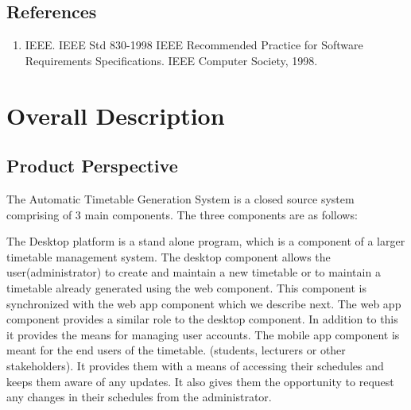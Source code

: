 \documentclass{scrreprt}
\begin{document}
   
 

\section{References}
\begin{enumerate}
 \item IEEE. IEEE Std 830-1998 IEEE Recommended Practice for Software Requirements Specifications. IEEE Computer Society, 1998.
\end{enumerate}

\chapter{Overall Description}

\section{Product Perspective}
  The Automatic Timetable Generation System is a closed source system comprising of 3  main components. The three components are as follows:
  
The Desktop platform is a stand alone program, which is a component of a larger timetable management system. The desktop component allows the user(administrator) to create and maintain a new timetable or to maintain a timetable already generated using the web component. This component is synchronized with the web app component which we describe next. The web app component provides a similar role to the desktop component. In addition to this it provides the means for managing user accounts. The mobile app component is meant for the end users of the timetable. (students, lecturers or other stakeholders). It provides them with a means of accessing their schedules and keeps them aware of any  updates. It also gives them the opportunity to request any changes in their schedules from the administrator.
\end{document}
